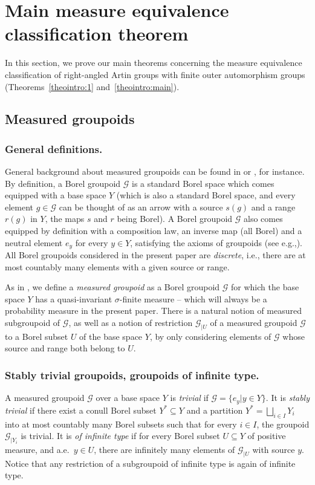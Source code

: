 \documentclass[11pt]{article}
\newcommand{\ie}{i.e.,\xspace}
\newcommand{\eg}{e.g.,\xspace}
\newcommand{\Subsection}{\subsection}
\numberwithin{equation}{section}
\let\mathcal\mathscr
\theoremstyle{plain}
\theoremstyle{definition}
\let\Dunion\bigsqcup
\newcommand{\calg}{\mathcal{G}}
\begin{document}
\section{Main measure equivalence classification theorem}\label{sec:me}

In this section, we prove our main theorems concerning the measure equivalence classification of right-angled Artin groups with finite outer automorphism groups (Theorems~\ref{theointro:1} and~\ref{theointro:main}).

\Subsection{Measured groupoids}

\subsubsection*{General definitions.} General background about measured groupoids can be found in \cite[\S 2.1]{AD} or \cite{Kid-survey}, for instance. By definition, a Borel groupoid $\mathcal{G}$ is a standard Borel space which comes equipped with a base space $Y$ (which is also a standard Borel space, and every element $g\in\calg$ can be thought of as an arrow with a source $s(g)$ and a range $r(g)$ in $Y$, the maps $s$ and $r$ being Borel). A Borel groupoid $\mathcal{G}$ also comes equipped by definition with a composition law, an inverse map (all Borel) and a neutral element $e_y$ for every $y\in Y$, satisfying the axioms of groupoids (see \eg \cite[Def.\,2.10]{Kid-survey}). All Borel groupoids considered in the present paper are \emph{discrete}, \ie there are at most countably many elements with a given source or range.

As in \cite[Def.\,2.13]{Kid-survey}, we define a \emph{measured groupoid} as a Borel groupoid $\mathcal{G}$ for which the base space $Y$ has a quasi-invariant $\sigma$-finite measure -- which will always be a probability measure in the present paper. There is a natural notion of measured subgroupoid of $\mathcal{G}$, as well as a notion of restriction $\mathcal{G}_{|U}$ of a measured groupoid $\mathcal{G}$ to a Borel subset $U$ of the base space $Y$, by only considering elements of $\calg$ whose source and range both belong to $U$.

\subsubsection*{Stably trivial groupoids, groupoids of infinite type.} A measured groupoid $\calg$ over a base space $Y$ is \emph{trivial} if $\calg=\{e_y|y\in Y\}$. It is \emph{stably trivial} if there exist a conull Borel subset $Y^*\subseteq Y$ and a partition $Y^*=\Dunion_{i\in I} Y_i$ into at most countably many Borel subsets such that for every $i\in I$, the groupoid $\calg_{|Y_i}$ is trivial. It is \emph{of infinite type} if for every Borel subset $U\subseteq Y$ of positive measure, and a.e.\ $y\in U$, there are infinitely many elements of $\calg_{|U}$ with source $y$. Notice that any restriction of a subgroupoid of infinite type is again of infinite type.
\end{document}
